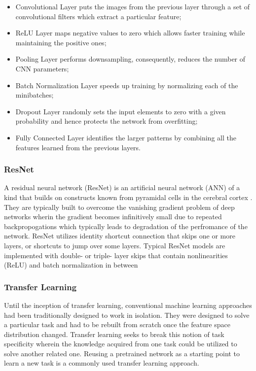\documentclass[doc/report.tex]{subfiles}
\begin{document}
\begin{itemize}
    \item Convolutional Layer puts the images from the previous layer through a
        set of convolutional filters which extract a particular feature;
    \item ReLU Layer maps negative values to zero which allows faster training
        while maintaining the positive ones;
    \item Pooling Layer performs downsampling, consequently, reduces the number
        of CNN parameters;
        \item Batch Normalization Layer speeds up training by normalizing each
            of the minibatches;
        \item Dropout Layer randomly sets the input elements to zero with a
            given probability and hence protects the network from overfitting;
        \item Fully Connected Layer identifies the larger patterns by combining
            all the features learned from the previous layers.
\end{itemize}

\subsubsection{ResNet}
A residual neural network (ResNet) is an artificial neural network (ANN) of a
kind that builds on constructs known from pyramidal cells in the cerebral
cortex \cite{Res}. They are typically built to overcome the vanishing gradient
problem of deep networks wherin the gradient becomes infinitively small due to
repeated backpropogations which typically leads to degradation of the
perfromance of the network. ResNet utilizes identity shortcut connection that
skips one or more layers, or shortcuts to jump over some layers. Typical ResNet
models are implemented with double- or triple- layer skips that contain
nonlinearities (ReLU) and batch normalization in between

\subsubsection{Transfer Learning}
Until the inception of transfer learning, conventional machine learning
approaches had been traditionally designed to work in isolation. They were
designed to solve a particular task and had to be rebuilt from scratch once the
feature space distribution changed. Transfer learning seeks to break this
notion of task specificity wherein the knowledge acquired from one task could
be utilized to solve another related one. Reusing a pretrained network as a
starting point to learn a new task is a commonly used transfer learning
approach.
\end{document}
